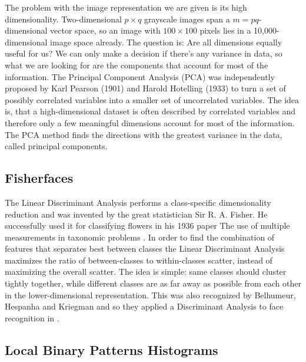 The problem with the image representation we are given is its high dimensionality. Two-dimensional $p \times q$ grayscale images span a $m = pq$-dimensional vector space, so an image with $100 \times 100$ pixels lies in a 10,000-dimensional image space already. The question is: Are all dimensions equally useful for us? We can only make a decision if there’s any variance in data, so what we are looking for are the components that account for most of the information. The Principal Component Analysis (PCA) was independently proposed by Karl Pearson (1901) and Harold Hotelling (1933) to turn a set of possibly correlated variables into a smaller set of uncorrelated variables. The idea is, that a high-dimensional dataset is often described by correlated variables and therefore only a few meaningful dimensions account for most of the information. The PCA method finds the directions with the greatest variance in the data, called principal components.


\subsection*{Fisherfaces} %
\label{sub:fisherfaces}

The Linear Discriminant Analysis performs a class-specific dimensionality reduction and was invented by the great statistician Sir R. A. Fisher. He successfully used it for classifying flowers in his 1936 paper The use of multiple measurements in taxonomic problems \cite{fisher1936use}. In order to find the combination of features that separates best between classes the Linear Discriminant Analysis maximizes the ratio of between-classes to within-classes scatter, instead of maximizing the overall scatter. The idea is simple: same classes should cluster tightly together, while different classes are as far away as possible from each other in the lower-dimensional representation. This was also recognized by Belhumeur, Hespanha and Kriegman and so they applied a Discriminant Analysis to face recognition in \cite{fisherfaces}.

\subsection*{Local Binary Patterns Histograms} %
\label{sub:local_binary_patterns_histograms}

